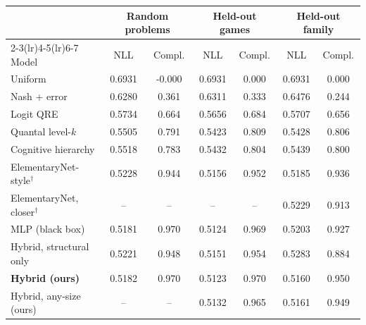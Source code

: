 \begin{tabular}{lcccccc}
\toprule
 & \multicolumn{2}{c}{Random problems} & \multicolumn{2}{c}{Held-out games} & \multicolumn{2}{c}{Held-out family} \\
\cmidrule(lr){2-3}\cmidrule(lr){4-5}\cmidrule(lr){6-7}
Model & NLL & Compl. & NLL & Compl. & NLL & Compl. \\
\midrule
Uniform & 0.6931 & -0.000 & 0.6931 & 0.000 & 0.6931 & 0.000 \\
Nash + error & 0.6280 & 0.361 & 0.6311 & 0.333 & 0.6476 & 0.244 \\
Logit QRE & 0.5734 & 0.664 & 0.5656 & 0.684 & 0.5707 & 0.656 \\
Quantal level-$k$ & 0.5505 & 0.791 & 0.5423 & 0.809 & 0.5428 & 0.806 \\
Cognitive hierarchy & 0.5518 & 0.783 & 0.5432 & 0.804 & 0.5439 & 0.800 \\
ElementaryNet-style$^\dagger$ & 0.5228 & 0.944 & 0.5156 & 0.952 & 0.5185 & 0.936 \\
ElementaryNet, closer$^\dagger$ & -- & -- & -- & -- & 0.5229 & 0.913 \\
MLP (black box) & 0.5181 & 0.970 & 0.5124 & 0.969 & 0.5203 & 0.927 \\
Hybrid, structural only & 0.5221 & 0.948 & 0.5151 & 0.954 & 0.5283 & 0.884 \\
\textbf{Hybrid (ours)} & 0.5182 & 0.970 & 0.5123 & 0.970 & 0.5160 & 0.950 \\
Hybrid, any-size (ours) & -- & -- & 0.5132 & 0.965 & 0.5161 & 0.949 \\
\bottomrule
\end{tabular}
